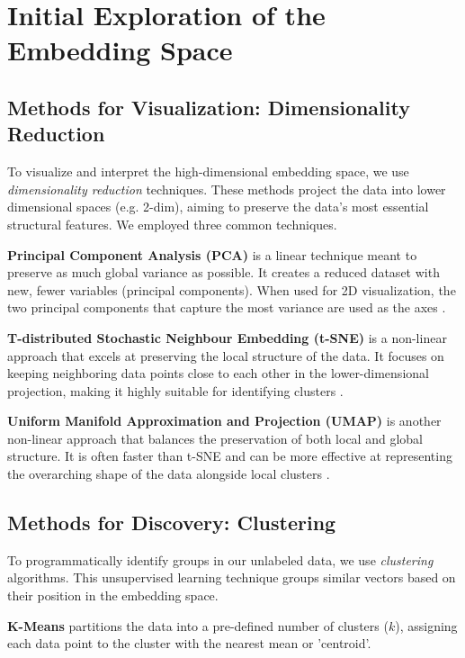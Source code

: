 \section{Initial Exploration of the Embedding Space}

\subsection{Methods for Visualization: Dimensionality Reduction}

To visualize and interpret the high-dimensional embedding space, we use
\emph{dimensionality reduction} techniques. These methods project the data into
lower dimensional spaces (e.g. 2-dim), aiming to preserve the data's most
essential structural features. We employed three common techniques.

\textbf{Principal Component Analysis (PCA)} is a linear technique meant to
preserve as much global variance as possible. It creates a reduced dataset with
new, fewer variables (principal components). When used for 2D visualization, the
two principal components that capture the most variance are used as the axes
\autocite{IBMndPrincipal}.

\textbf{T-distributed Stochastic Neighbour Embedding (t-SNE)} is a non-linear
approach that excels at preserving the local structure of the data. It focuses
on keeping neighboring data points close to each other in the lower-dimensional
projection, making it highly suitable for identifying clusters
\autocite{Mazraeh2025Comprehensive}.

\textbf{Uniform Manifold Approximation and Projection (UMAP)} is another
non-linear approach that balances the preservation of both local and global
structure. It is often faster than t-SNE and can be more effective at
representing the overarching shape of the data alongside local clusters
\autocite{CoenennpUnderstanding}.

\subsection{Methods for Discovery: Clustering}

To programmatically identify groups in our unlabeled data, we use
\emph{clustering} algorithms. This unsupervised learning technique groups
similar vectors based on their position in the embedding space.

\textbf{K-Means} partitions the data into a pre-defined number of clusters
($k$), assigning each data point to the cluster with the nearest mean or
'centroid'.

